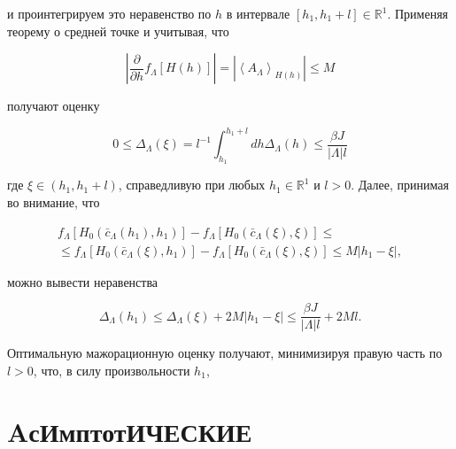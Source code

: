 \documentclass[10pt]{article}
\begin{document}
и проинтегрируем это неравенство по $h$ в интервале $\left[h_{1}, h_{1}+l\right] \in \mathbb{R}^{1}$. Применяя теорему о средней точке и учитывая, что



\[

\left|\frac{\partial}{\partial h} f_{\Lambda}[H(h)]\right|=\left|\left\langle A_{\Lambda}\right\rangle_{H(h)}\right| \leqslant M

\]



получают оценку



\[

0 \leqslant \Delta_{\Lambda}(\xi)=l^{-1} \int_{h_{1}}^{h_{1}+l} d h \Delta_{\Lambda}(h) \leqslant \frac{\beta J}{|\Lambda| l}

\]



где $\xi \in\left(h_{1}, h_{1}+l\right)$, справедливую при любых $h_{1} \in \mathbb{R}^{1}$ и $l>0$. Далее, принимая во внимание, что



\[

\begin{gathered}

f_{\Lambda}\left[H_{0}\left(\bar{c}_{\Lambda}\left(h_{1}\right), h_{1}\right)\right]-f_{\Lambda}\left[H_{0}\left(\bar{c}_{\Lambda}(\xi), \xi\right)\right] \leqslant \\

\leqslant f_{\Lambda}\left[H_{0}\left(\bar{c}_{\Lambda}(\xi), h_{1}\right)\right]-f_{\Lambda}\left[H_{0}\left(\bar{c}_{\Lambda}(\xi), \xi\right)\right] \leqslant M\left|h_{1}-\xi\right|,

\end{gathered}

\]



можно вывести неравенства



\[

\Delta_{\Lambda}\left(h_{1}\right) \leqslant \Delta_{\Lambda}(\xi)+2 M\left|h_{1}-\xi\right| \leqslant \frac{\beta J}{|\Lambda| l}+2 M l .

\]



Оптимальную мажорационную оценку получают, минимизируя правую часть по $l>0$, что, в силу произвольности $h_{1}$,



\section{AсИмптотИЧЕСКИЕ}
\end{document}
